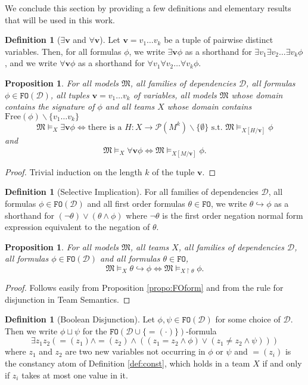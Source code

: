 \documentclass{article}
\newtheorem{Proposition}[Theorem]{Proposition}
\theoremstyle{definition}
\newtheorem{Definition}[Theorem]{Definition}
\newcommand{\tuple}{\mathbf}
\newcommand{\FO}{\texttt{FO}}
\newcommand{\M}{\mathfrak M}
\newcommand{\DD}{\mathcal D}
\newcommand{\parts}{\mathcal P}
\newcommand{\fv}{\text{Free}}
\begin{document}
We conclude this section by providing a few definitions and elementary results that will be used in this work. 

\begin{Definition}[$\exists \tuple v$ and $\forall \tuple v$]
Let $\tuple v = v_1 \ldots v_k$ be a tuple of pairwise distinct variables. Then, for all formulas $\phi$, we write $\exists \tuple v \phi$ as a shorthand for $\exists v_1 \exists v_2 \ldots \exists v_k \phi$, and we write $\forall \tuple v \phi$ as a shorthand for $\forall v_1 \forall v_2 \ldots \forall v_k \phi$. 
\end{Definition}
\begin{Proposition}
For all models $\M$, all families of dependencies $\DD$, all formulas $\phi \in \FO(\DD)$, all tuples $\tuple v = v_1 \ldots v_k$ of variables, all models $\M$ whose domain contains the signature of $\phi$ and all teams $X$ whose domain contains $\fv(\phi) \backslash \{v_1 \ldots v_k\}$ 
\[
\M \models_X \exists \tuple v \phi \Leftrightarrow \text{there is a } H: X \rightarrow \parts(M^k) \backslash \{\emptyset\} \text{ s.t. } \M \models_{X[H/\tuple v]} \phi
\]
and 
\[
\M \models_X \forall \tuple v \phi \Leftrightarrow \M \models_{X[M/\tuple v]} \phi.
\]
\end{Proposition}
\begin{proof}
Trivial induction on the length $k$ of the tuple $\tuple v$.
\end{proof}
\begin{Definition}[Selective Implication]
For all families of dependencies $\DD$, all formulas $\phi \in \FO(\DD)$ and all first order formulas $\theta \in \FO$, we write $\theta \hookrightarrow \phi$ as a shorthand for $(\lnot \theta) \vee (\theta \wedge \phi)$ where $\lnot \theta$ is the first order negation normal form expression equivalent to the negation of $\theta$. 
\label{def:selimp}
\end{Definition}
\begin{Proposition}
For all models $\M$, all teams $X$, all families of dependencies $\DD$, all formulas $\phi \in \FO(\DD)$ and all formulas $\theta \in \FO$, 
\[
\M \models_X \theta \hookrightarrow \phi \Leftrightarrow \M \models_{X \upharpoonright \theta} \phi.
\]
\label{propo:selimp}
\end{Proposition}
\begin{proof}
Follows easily from Proposition \ref{propo:FOform} and from the rule for disjunction in Team Semantics. 
\end{proof}
\begin{Definition}[Boolean Disjunction]
Let $\phi, \psi \in \FO(\DD)$ for some choice of $\DD$. Then we write $\phi \sqcup \psi$ for the $\FO(\DD \cup \{ =\!\!(\cdot)\})$-formula 
\[
\exists z_1 z_2 (=\!\!(z_1) \wedge =\!\!(z_2) \wedge (( z_1 = z_2 \wedge \phi) \vee (z_1 \not = z_2 \wedge \psi)))
\]
where $z_1$ and $z_2$ are two new variables not occurring in $\phi$ or $\psi$ and $=\!\!(z_i)$ is the constancy atom of Definition \ref{def:const}, which holds in a team $X$ if and only if $z_i$ takes at most one value in it. 
\label{def:booldisj}
\end{Definition}
\end{document}
